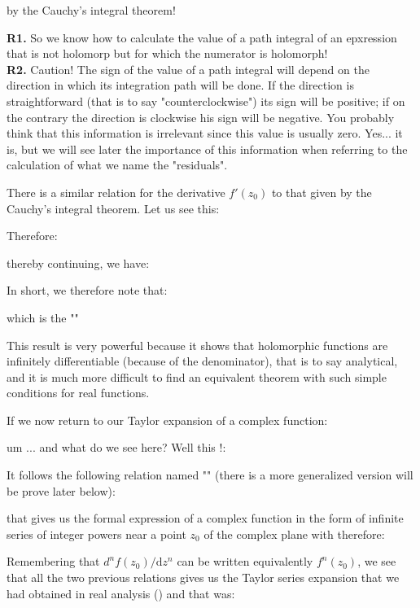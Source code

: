 	by the Cauchy's integral theorem!
	
	\begin{tcolorbox}[title=Remarks,colframe=black,arc=10pt]
\textbf{R1.} So we know how to calculate the value of a path integral of an epxression that is not holomorp but for which the numerator is holomorph!\\

\textbf{R2.} Caution! The sign of the value of a path integral will depend on the direction in which its integration path will be done. If the direction is straightforward (that is to say "counterclockwise") its sign will be positive; if on the contrary the direction is clockwise his sign will be negative. You probably think that this information is irrelevant since this value is usually zero. Yes... it is, but we will see later the importance of this information when referring to the calculation of what we name the "residuals".
	\end{tcolorbox}
	
	There is a similar relation for the derivative $f'(z_0)$ to that given by the Cauchy's integral theorem. Let us see this:
	
	Therefore:
	
	thereby continuing, we have:
	
	In short, we therefore note that:
	
	which is the ""
	
	This result is very powerful because it shows that holomorphic functions are infinitely differentiable (because of the denominator), that is to say analytical, and it is much more difficult to find an equivalent theorem with such simple conditions for real functions.
	
	If we now return to our Taylor expansion of a complex function:
	
	um ... and what do we see here? Well this !:
	
	It follows the following relation named "" (there is a more generalized version will be prove later below):
	
	that gives us the formal expression of a complex function in the form of infinite series of integer powers near a point $z_0$ of the complex plane with therefore:
	
	Remembering that $d^{n}f(z_0)/\mathrm{d}z^n$ can be written equivalently $f^n(z_0)$, we see that all the two previous relations gives us the Taylor series expansion that we had obtained in real analysis () and that was:
	
